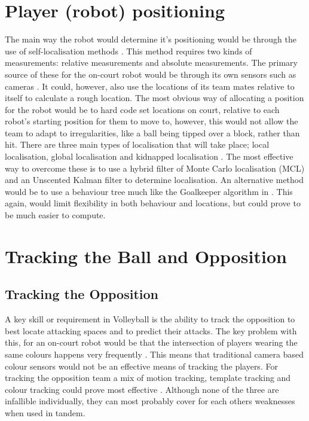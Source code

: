 \documentclass{scrartcl}
\begin{document}
\section{Player (robot) positioning}
The main way the robot would determine it's positioning would be through the use of self-localisation methods \cite{teimouri2016hybrid}. This method requires two kinds of measurements: relative measurements and absolute measurements. The primary source of these for the on-court robot would be through its own sensors such as cameras \cite{teimouri2016hybrid}. It could, however, also use the locations of its team mates relative to itself to calculate a rough location. The most obvious way of allocating a position for the robot would be to hard code set locations on court, relative to each robot's starting position for them to move to, however, this would not allow the team to adapt to irregularities, like a ball being tipped over a block, rather than hit. There are three main types of localisation that will take place; local localisation, global localisation and kidnapped localisation \cite{teimouri2016hybrid}. The most effective way to overcome these is to use a hybrid filter of Monte Carlo localisation (MCL) \cite{dellaert1999monte} and an Unscented Kalman filter \cite{teimouri2016hybrid} to determine localisation. An alternative method would be to use a behaviour tree much like the Goalkeeper algorithm in \cite{sungkono2016decision}. This again, would limit flexibility in both behaviour and locations, but could prove to be much easier to compute.

\section{Tracking the Ball and Opposition }
\subsection{Tracking the Opposition}
A key skill or requirement in Volleyball is the ability to track the opposition to best locate attacking spaces and to predict their attacks. The key problem with this, for an on-court robot would be that the intersection of players wearing the same colours happens very frequently \cite{cheng2014player}. This means that traditional camera based colour sensors would not be an effective means of tracking the players. For tracking the opposition team a mix of motion tracking, template tracking and colour tracking could prove most effective \cite{pers2000computer}. Although none of the three are infallible individually, they can most probably cover for each others weaknesses when used in tandem.
\end{document}
